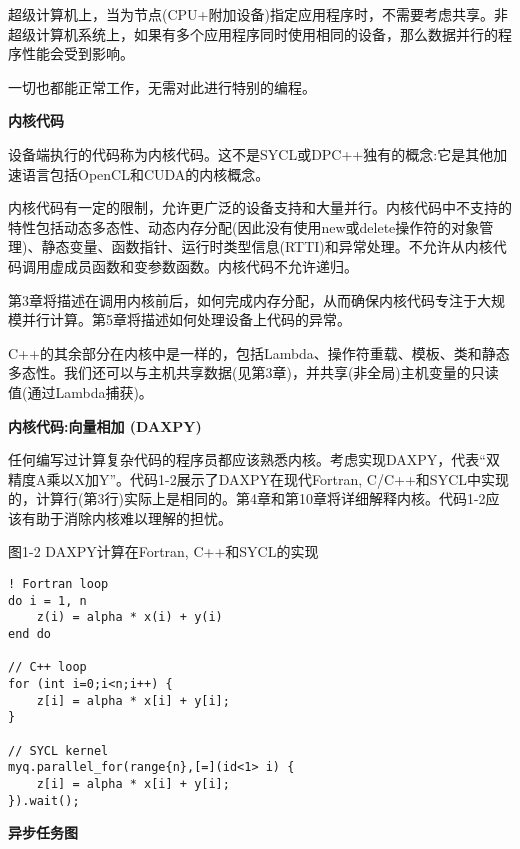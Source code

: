 超级计算机上，当为节点(CPU+附加设备)指定应用程序时，不需要考虑共享。非超级计算机系统上，如果有多个应用程序同时使用相同的设备，那么数据并行的程序性能会受到影响。\par

一切也都能正常工作，无需对此进行特别的编程。\par

\hspace*{\fill} \par %
\textbf{内核代码}

设备端执行的代码称为内核代码。这不是SYCL或DPC++独有的概念:它是其他加速语言包括OpenCL和CUDA的内核概念。\par

内核代码有一定的限制，允许更广泛的设备支持和大量并行。内核代码中不支持的特性包括动态多态性、动态内存分配(因此没有使用new或delete操作符的对象管理)、静态变量、函数指针、运行时类型信息(RTTI)和异常处理。不允许从内核代码调用虚成员函数和变参数函数。内核代码不允许递归。\par

第3章将描述在调用内核前后，如何完成内存分配，从而确保内核代码专注于大规模并行计算。第5章将描述如何处理设备上代码的异常。\par

C++的其余部分在内核中是一样的，包括Lambda、操作符重载、模板、类和静态多态性。我们还可以与主机共享数据(见第3章)，并共享(非全局)主机变量的只读值(通过Lambda捕获)。\par

\hspace*{\fill} \par %
\textbf{内核代码:向量相加 (DAXPY)}

任何编写过计算复杂代码的程序员都应该熟悉内核。考虑实现DAXPY，代表“双精度A乘以X加Y”。代码1-2展示了DAXPY在现代Fortran, C/C++和SYCL中实现的，计算行(第3行)实际上是相同的。第4章和第10章将详细解释内核。代码1-2应该有助于消除内核难以理解的担忧。\par

图1-2 DAXPY计算在Fortran, C++和SYCL的实现
\begin{lstlisting}[caption={}]
! Fortran loop
do i = 1, n
	z(i) = alpha * x(i) + y(i)
end do

// C++ loop
for (int i=0;i<n;i++) {
	z[i] = alpha * x[i] + y[i];
}

// SYCL kernel
myq.parallel_for(range{n},[=](id<1> i) {
	z[i] = alpha * x[i] + y[i];
}).wait();
\end{lstlisting}

\hspace*{\fill} \par %
\textbf{异步任务图}

